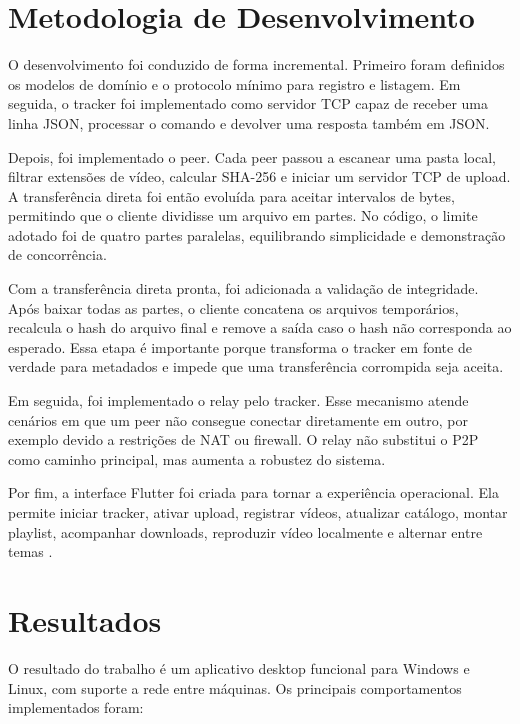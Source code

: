 \documentclass[
	12pt,
	oneside,
	a4paper,
	chapter=TITLE,
	section=TITLE,
	english,
	brazilian,
	sumario=tradicional
]{abntex2}
\begin{document}
\section{Metodologia de Desenvolvimento}

O desenvolvimento foi conduzido de forma incremental. Primeiro foram definidos os modelos de domínio e o protocolo mínimo para registro e listagem. Em seguida, o tracker foi implementado como servidor TCP capaz de receber uma linha JSON, processar o comando e devolver uma resposta também em JSON.

Depois, foi implementado o peer. Cada peer passou a escanear uma pasta local, filtrar extensões de vídeo, calcular SHA-256 e iniciar um servidor TCP de upload. A transferência direta foi então evoluída para aceitar intervalos de bytes, permitindo que o cliente dividisse um arquivo em partes. No código, o limite adotado foi de quatro partes paralelas, equilibrando simplicidade e demonstração de concorrência.

Com a transferência direta pronta, foi adicionada a validação de integridade. Após baixar todas as partes, o cliente concatena os arquivos temporários, recalcula o hash do arquivo final e remove a saída caso o hash não corresponda ao esperado. Essa etapa é importante porque transforma o tracker em fonte de verdade para metadados e impede que uma transferência corrompida seja aceita.

Em seguida, foi implementado o relay pelo tracker. Esse mecanismo atende cenários em que um peer não consegue conectar diretamente em outro, por exemplo devido a restrições de NAT ou firewall. O relay não substitui o P2P como caminho principal, mas aumenta a robustez do sistema.

Por fim, a interface Flutter foi criada para tornar a experiência operacional. Ela permite iniciar tracker, ativar upload, registrar vídeos, atualizar catálogo, montar playlist, acompanhar downloads, reproduzir vídeo localmente e alternar entre temas \cite{flutterdocs,dartio,mediakit}.

\section{Resultados}

O resultado do trabalho é um aplicativo desktop funcional para Windows e Linux, com suporte a rede entre máquinas. Os principais comportamentos implementados foram:
\end{document}
